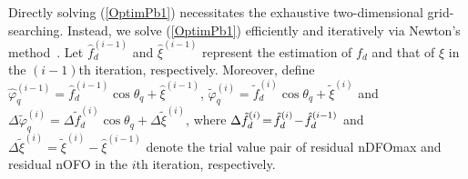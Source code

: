 \documentclass[12pt, draftclsnofoot, onecolumn]{IEEEtran}
\begin{document}
Directly solving (\ref{OptimPb1}) necessitates the exhaustive two-dimensional grid-searching. Instead, we solve (\ref{OptimPb1}) efficiently and iteratively via Newton's method~\cite{S_Boyd2004}.
Let $\hat{f}_{d}^{\left( i-1 \right)}$ and $\hat{\xi}^{\left( i-1 \right)}$ represent the estimation of ${f}_{d}$ and that of $\xi$ in the $\left( i-1 \right)$th iteration, respectively. Moreover, define $\hat{\varphi}_{q}^{\left( i-1 \right)} \!=\! \hat{f}_{d}^{\left( i-1 \right)}\cos{{\theta }_{q}} + \hat{\xi}^{\left( i-1 \right)}$, $\tilde{\varphi}_{q}^{\left( i \right)} \!=\! \tilde{f}_{d}^{\left( i \right)}\cos{{\theta }_{q}} + \tilde{\xi}^{\left( i \right)}$ and $\Delta {\tilde{\varphi}^{\left( i\right)}_{q}} \!=\! \Delta {\tilde{f}^{\left( i\right)}_{d}}\cos{{\theta }_{q}} + \Delta \tilde{\xi}^{\left( i\right)}$, where $\Delta {\tilde{f}_{d}^{\left( i \right)}} \!=\! {\tilde{f}^{\left( i\right)}_{d}} \\ \!-\! \hat{f}_{d}^{\left( i-1 \right)}$ and $\Delta \tilde{\xi}^{\left( i \right)} \!=\! \tilde{\xi}^{\left( i\right)} \!-\! \hat{\xi}^{\left( i-1 \right)}$ denote the trial value pair of residual nDFOmax and residual nOFO in the $i$th iteration, respectively.
\end{document}
